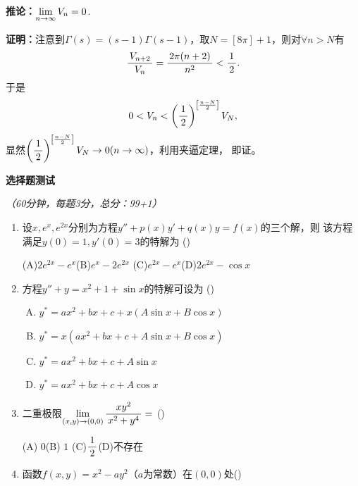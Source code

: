 {\bf 推论：}$\lim\limits_{n\to\infty} V_n=0$.

{\bf 证明：}注意到$\Gamma(s)=(s-1)\Gamma(s-1)$，取$N=[8\pi]+1$，则对$\forall n>N$有
$$\displaystyle\frac{\,{V_{n+2}}\,}{\,{V_n}\,}=\displaystyle\frac{\,{2\pi(n+2)}\,}{\,{n^2}\,}<\displaystyle\frac{\,{1}\,}{\,{2}\,}.$$
于是
$$0<V_n<\left(\displaystyle\frac{\,{1}\,}{\,{2}\,}\right)^{\left[\frac{n-N}2\right]}V_N,$$
显然$\left(\displaystyle\frac{\,{1}\,}{\,{2}\,}\right)^{\left[\frac{n-N}2\right]}V_N\to0(n\to\infty)$，利用夹逼定理，
即证。


\newpage

\begin{center}
	{\Large\bf 选择题测试}
	
	{\it （60分钟，每题3分，总分：99+1）}
\end{center}

\begin{enumerate}
  \item 设$x,e^x,e^{2x}$分别为方程$y''+p(x)y'+q(x)y=f(x)$的三个解，则
  该方程满足$y(0)=1,y'(0)=3$的特解为
  (\underline{\hspace{1cm}})
  
  (A)$2e^{2x}-e^x$\hspace{1cm}(B)$e^x-2e^{2x}$ \hspace{1cm}
  (C)$e^{2x}-e^x$\hspace{1cm}(D)$2e^{2x}-\cos x$
  \item 方程$y''+y=x^2+1+\sin x$的特解可设为
  (\underline{\hspace{1cm}})
  \begin{enumerate}[(A)]
    \item $y^*=ax^2+bx+c+x(A\sin x+B\cos x)$
    \item $y^*=x(ax^2+bx+c+A\sin x+B\cos x)$
    \item $y^*=ax^2+bx+c+A\sin x$
    \item $y^*=ax^2+bx+c+A\cos x$
  \end{enumerate}
  \item 二重极限$\lim\limits_{(x,y)\to(0,0)}\displaystyle\frac{\,{xy^2}\,}{\,{x^2+y^4}\,}=$
  (\underline{\hspace{1cm}})
  
  (A) $0$\hspace{1cm}(B) $1$  \hspace{1cm}(C)$\displaystyle\frac{\,{1}\,}{\,{2}\,}$\hspace{1cm}(D)不存在
  \item 函数$f(x,y)=x^2-ay^2$（$a$为常数）在$(0,0)$处(\underline{\hspace{1cm}})
  

\end{enumerate}
